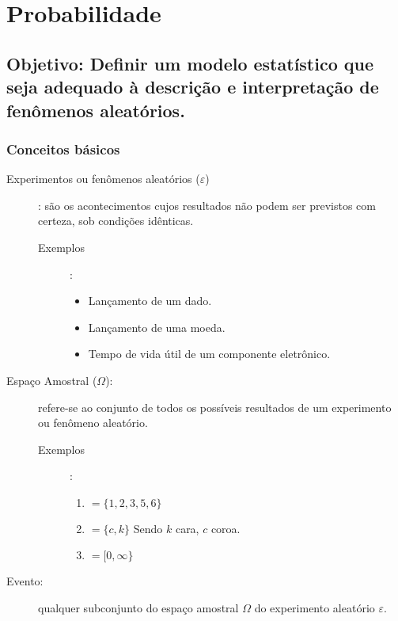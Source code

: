 \chapter{Probabilidade}

\section*{Objetivo: Definir um modelo estatístico que seja adequado à descrição e interpretação de fenômenos aleatórios.}
\subsection{Conceitos básicos}
\begin{description}

  \item [Experimentos ou fenômenos aleatórios ($\varepsilon$)]: são os acontecimentos cujos resultados não podem ser previstos 
    com certeza, sob condições idênticas.

    \begin{description}
      \item [Exemplos]:

        \begin{itemize}
          \item Lançamento de um dado.
          \item Lançamento de uma moeda.
          \item Tempo de vida útil de um componente eletrônico.
        \end{itemize}
    \end{description}
  \item [Espaço Amostral ($\Omega$):] refere-se ao conjunto de todos os possíveis resultados de um experimento ou fenômeno 
    aleatório.
    \begin{description}
      \item [Exemplos]:
        \begin{enumerate}[label=$\Omega_{\arabic*}$]
          \item $= \{ 1,2,3,5,6 \}$ 
          \item $= \{ c,k \}$ Sendo $k$ cara, $c$ coroa.
        \item $= [ 0,\infty \}$ 
      \end{enumerate}
  \end{description}
\item [Evento:] qualquer subconjunto do espaço amostral $\Omega$ do experimento aleatório $\varepsilon$.

\end{description}
